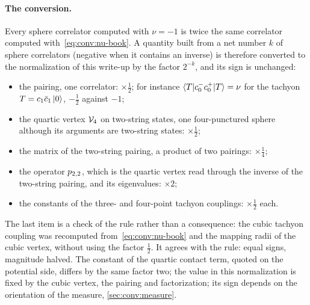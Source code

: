 \paragraph{The conversion.}
Every sphere correlator computed with $\nu = -1$ is twice the same correlator computed with~\eqref{eq:conv:nu-book}.
A quantity built from a net number $k$ of sphere correlators (negative when it contains an inverse) is therefore converted to the normalization of this write-up by the factor $2^{-k}$, and its sign is unchanged:
\begin{itemize}
  \setlength{\itemsep}{0.5ex}

  \item the pairing, one correlator: $\times \tfrac{1}{2}$; for instance $\braket{T | c_0^- c_0^+ | T} = \nu$ for the tachyon $T = c_1 \bar c_1 \ket{0}$, $-\tfrac{1}{2}$ against $-1$;

  \item the quartic vertex $\mathcal{V}_{4}$ on two-string states, one four-punctured sphere although its arguments are two-string states: $\times \tfrac{1}{2}$;

  \item the matrix of the two-string pairing, a product of two pairings: $\times \tfrac{1}{4}$;

  \item the operator $p_{2,2}$, which is the quartic vertex read through the inverse of the two-string pairing, and its eigenvalues: $\times 2$;

  \item the constants of the three- and four-point tachyon couplings: $\times \tfrac{1}{2}$ each.
\end{itemize}
The last item is a check of the rule rather than a consequence: the cubic tachyon coupling was recomputed from~\eqref{eq:conv:nu-book} and the mapping radii of the cubic vertex, without using the factor $\tfrac{1}{2}$.
It agrees with the rule: equal signs, magnitude halved.
The constant of the quartic contact term, quoted on the potential side, differs by the same factor two; the value in this normalization is fixed by the cubic vertex, the pairing and factorization; its sign depends on the orientation of the measure, \cref{sec:conv:measure}.

